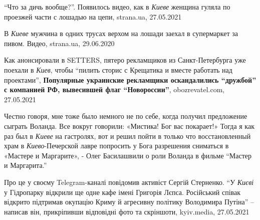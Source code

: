 \enquote{Что за дичь вообще?}. Появилось видео, как в \emph{Киеве} женщина
гуляла по проезжей части с лошадью на цепи, strana.ua, 27.05.2021

В \emph{Киеве} мужчина в одних трусах верхом на лошади заехал в супермаркет за пивом.
Видео, strana.ua, 29.06.2020

Как анонсировали в SETTERS, пятеро рекламщиков из Санкт-Петербурга уже поехали
в \emph{Киев}, чтобы \enquote{пилить сторис с Крещатика и вместе работать над
проектами}, \textbf{Популярные украинские рекламщики оскандалились
\enquote{дружбой} с компанией РФ, вывесившей флаг \enquote{Новороссии}},
obozrevatel.com, 27.05.2021

Честно говоря, мне тоже было немного не по себе, когда получил предложение
сыграть Воланда. Все вокруг говорили: «Мистика! Бог вас покарает!» Тогда я как
раз был в \emph{Киеве} на гастролях, вот и решил пойти в только что восстановленный
храм в \emph{Киево}-Печерской лавре попросить у Бога разрешения сниматься в «Мастере и
Маргарите», - Олег Басилашвили о роли Воланда в фильме  \enquote{Мастер и Маргарита.}

Про це у своєму Telegram-каналі повідомив активіст Сергій Стерненко.
\enquote{У \emph{Києві} у Гідропарку відкрили ще одне кафе імені Григорія
Лєпса.  Російський співак відкрито підтримав окупацію Криму й агресивну
політику Володимира Путіна} – написав він, прикріпивши відповідні фото та
скріншоти, kyiv.media, 27.05.2021

